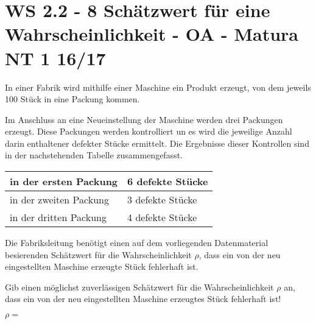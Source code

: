 \section{WS 2.2 - 8 Schätzwert für eine Wahrscheinlichkeit - OA - Matura NT 1 16/17}

\begin{beispiel}[WS 2.2]{1} %
In einer Fabrik wird mithilfe einer Maschine ein Produkt erzeugt, von dem jeweils 100 Stück in eine Packung kommen.

Im Anschluss an eine Neueinstellung der Maschine werden drei Packungen erzeugt. Diese Packungen werden kontrolliert un es wird die jeweilige Anzahl darin enthaltener defekter Stücke ermittelt. Die Ergebnisse dieser Kontrollen sind in der nachstehenden Tabelle zusammengefasst.

\begin{center}
	\begin{tabular}{|l|l|}\hline
	\cellcolor[gray]{0.9}in der ersten Packung&6 defekte Stücke\\ \hline
	\cellcolor[gray]{0.9}in der zweiten Packung&3 defekte Stücke\\ \hline
	\cellcolor[gray]{0.9}in der dritten Packung&4 defekte Stücke\\ \hline	
	\end{tabular}
\end{center}

Die Fabriksleitung benötigt einen auf dem vorliegenden Datenmaterial besierenden Schätzwert für die Wahrscheinlichkeit $\rho$, dass ein von der neu eingestellten Maschine erzeugte Stück fehlerhaft ist.

Gib einen möglichst zuverlässigen Schätzwert für die Wahrscheinlichkeit $\rho$ an, dass ein von der neu eingestellten Maschine erzeugtes Stück fehlerhaft ist!

$\rho=$ 

\end{beispiel}